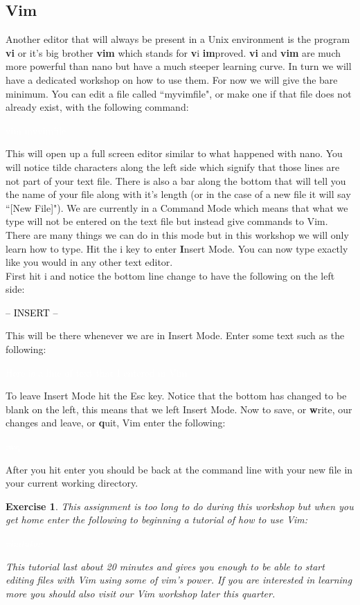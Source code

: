 \documentclass[oneside]{book}
\newcommand{\commandline}[1]{\begin{center} \colorbox{Dark}{\textcolor{white}{#1}} \end{center}}
\newcommand{\exampleout}[1]{\begin{center} \colorbox{Light}{\textcolor{black}{#1}} \end{center}}
\newtheorem{ex}{Exercise}[chapter]
\begin{document}
\subsection{Vim}
Another editor that will always be present in a Unix environment is the program \textbf{vi} or it's big brother \textbf{vim} which stands for \textbf{v}i \textbf{im}proved. \textbf{vi} and \textbf{vim} are much more powerful than nano but have a much steeper learning curve. In turn we will have a dedicated workshop on how to use them. For now we will give the bare minimum. You can edit a file called ``myvimfile", or make one if that file does not already exist, with the following command:
\commandline{vim myvimfile}
This will open up a full screen editor similar to what happened with nano. You will notice tilde characters along the left side which signify that those lines are not part of your text file. There is also a bar along the bottom that will tell you the name of your file along with it's length (or in the case of a new file it will say ``[New File]"). We are currently in a Command Mode which means that what we type will not be entered on the text file but instead give commands to Vim. There are many things we can do in this mode but in this workshop we will only learn how to type. Hit the i key to enter \textbf{I}nsert Mode. You can now type exactly like you would in any other text editor. \\
First hit i and notice the bottom line change to have the following on the left side:
\exampleout{--  INSERT  --}
This will be there whenever we are in Insert Mode. Enter some text such as the following:
\commandline{ Here is a line of text that I entered in Vim}
To leave Insert Mode hit the Esc key. Notice that the bottom has changed to be blank on the left, this means that we left Insert Mode. Now to save, or \textbf{w}rite, our changes and leave, or \textbf{q}uit, Vim enter the following:
\commandline{:wq}
After you hit enter you should be back at the command line with your new file in your current working directory.
\begin{ex}
    This assignment is too long to do during this workshop but when you get home enter the following to beginning a tutorial of how to use Vim:
    \commandline{vimtutor}
    This tutorial last about 20 minutes and gives you enough to be able to start editing files with Vim using some of vim's power. If you are interested in learning more you should also visit our Vim workshop later this quarter.  
\end{ex}
\end{document}
